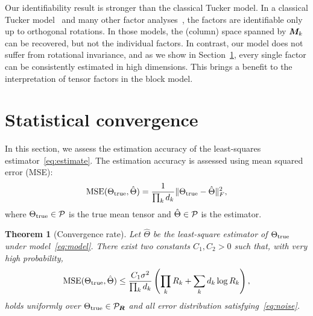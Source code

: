 \documentclass{article}
\newtheorem{theorem}{Theorem}
\begin{document}
Our identifiability result is stronger than the classical Tucker model. In a classical Tucker model~\cite{zhang2018tensor,kolda2009tensor} and many other factor analyses~\cite{darton1980rotation,abdi2003factor}, the factors are identifiable only up to orthogonal rotations. In those models, the (column) space spanned by $\bm M_k$ can be recovered, but not the individual factors. In contrast, our model does not suffer from rotational invariance, and as we show in Section~\ref{sec:theory}, every single factor can be consistently estimated in high dimensions. This brings a benefit to the interpretation of tensor factors in the block model.  



\section{Statistical convergence}\label{sec:theory}
In this section, we assess the estimation accuracy of the least-squares estimator~\eqref{eq:estimate}. The estimation accuracy is assessed using mean squared error (MSE):
\begin{equation}\label{eq:MSE}
\text{MSE}(\Theta_{\text{true}},\hat \Theta)={1\over \prod_k d_k}\lVert\Theta_{\text{true}}-\hat \Theta\rVert_F^2,
\end{equation}
where $\Theta_{\text{true}}\in\mathcal{P}$ is the true mean tensor and $\hat \Theta\in\mathcal{P}$ is the estimator. 



\begin{theorem}[Convergence rate] \label{thm:main}
Let $\hat \Theta$ be the least-square estimator of $\Theta_{\text{true}}$ under model~\eqref{eq:model}. There exist two constants $C_1, C_2>0$ such that, with very high probability,  
\begin{equation}\label{eq:bound}
\text{MSE}(\Theta_{\text{true}},\hat \Theta)\leq {C_1 \sigma^2\over  \prod_k d_k} \left(\prod_k R_k+\sum_k d_k \log R_k\right),
\end{equation}
holds uniformly over $\Theta_{\text{true}}\in\mathcal{P}_{\bm{R}}$ and all error distribution satisfying~\eqref{eq:noise}. 
\end{theorem}
\end{document}
